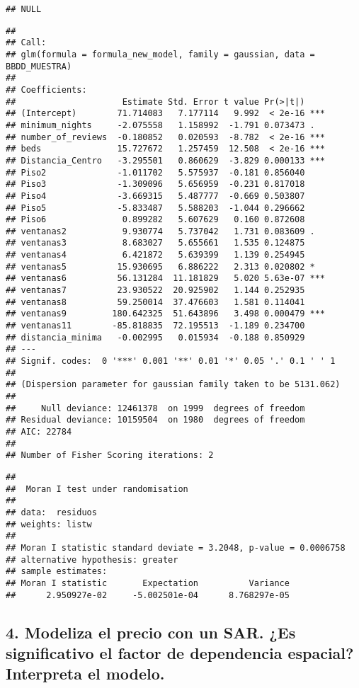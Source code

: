 \documentclass[
]{article}
\begin{document}
\begin{verbatim}
## NULL
\end{verbatim}

\begin{verbatim}
## 
## Call:
## glm(formula = formula_new_model, family = gaussian, data = BBDD_MUESTRA)
## 
## Coefficients:
##                     Estimate Std. Error t value Pr(>|t|)    
## (Intercept)        71.714083   7.177114   9.992  < 2e-16 ***
## minimum_nights     -2.075558   1.158992  -1.791 0.073473 .  
## number_of_reviews  -0.180852   0.020593  -8.782  < 2e-16 ***
## beds               15.727672   1.257459  12.508  < 2e-16 ***
## Distancia_Centro   -3.295501   0.860629  -3.829 0.000133 ***
## Piso2              -1.011702   5.575937  -0.181 0.856040    
## Piso3              -1.309096   5.656959  -0.231 0.817018    
## Piso4              -3.669315   5.487777  -0.669 0.503807    
## Piso5              -5.833487   5.588203  -1.044 0.296662    
## Piso6               0.899282   5.607629   0.160 0.872608    
## ventanas2           9.930774   5.737042   1.731 0.083609 .  
## ventanas3           8.683027   5.655661   1.535 0.124875    
## ventanas4           6.421872   5.639399   1.139 0.254945    
## ventanas5          15.930695   6.886222   2.313 0.020802 *  
## ventanas6          56.131284  11.181829   5.020 5.63e-07 ***
## ventanas7          23.930522  20.925902   1.144 0.252935    
## ventanas8          59.250014  37.476603   1.581 0.114041    
## ventanas9         180.642325  51.643896   3.498 0.000479 ***
## ventanas11        -85.818835  72.195513  -1.189 0.234700    
## distancia_minima   -0.002995   0.015934  -0.188 0.850929    
## ---
## Signif. codes:  0 '***' 0.001 '**' 0.01 '*' 0.05 '.' 0.1 ' ' 1
## 
## (Dispersion parameter for gaussian family taken to be 5131.062)
## 
##     Null deviance: 12461378  on 1999  degrees of freedom
## Residual deviance: 10159504  on 1980  degrees of freedom
## AIC: 22784
## 
## Number of Fisher Scoring iterations: 2
\end{verbatim}

\begin{verbatim}
## 
##  Moran I test under randomisation
## 
## data:  residuos  
## weights: listw    
## 
## Moran I statistic standard deviate = 3.2048, p-value = 0.0006758
## alternative hypothesis: greater
## sample estimates:
## Moran I statistic       Expectation          Variance 
##      2.950927e-02     -5.002501e-04      8.768297e-05
\end{verbatim}

\subsection{4. Modeliza el precio con un SAR. ¿Es significativo el
factor de dependencia espacial? Interpreta el
modelo.}\label{modeliza-el-precio-con-un-sar.-es-significativo-el-factor-de-dependencia-espacial-interpreta-el-modelo.}
\end{document}
